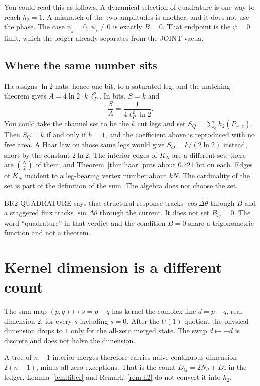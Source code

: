 You could read this as follows.
A dynamical selection of quadrature is one way to reach \(h_2=1\).
A mismatch of the two amplitudes is another, and it does not use the
phase. The case \(\psi_j=0\), \(\psi_i\neq 0\) is exactly \(B=0\).
That endpoint is the \(\psi=0\) limit, which the ledger already separates
from the JOINT vacua.

\subsection{Where the same number sits}

I1a assigns \(\ln 2\) nats, hence one bit, to a saturated leg, and the
matching theorem gives \(A=4\ln 2\cdot k\,\ell_P^2\).
In bits, \(S=k\) and
\[
\frac{S}{A}=\frac{1}{4\ell_P^2\ln 2}.
\]
You could take the channel set to be the \(k\) cut legs and set
\(S_Q=\sum_e h_2(P_{-,e})\).
Then \(S_Q=k\) if and only if \(\bar h=1\),
and the coefficient above is reproduced with no free area.
A Haar law on those same legs would give \(S_Q=k/(2\ln 2)\) instead,
short by the constant \(2\ln 2\).
The interior edges of \(K_N\) are a different set:
there are \(\binom{N}{2}\) of them, and Theorem~\ref{thm:haar}
puts about \(0.721\) bit on each.
Edges of \(K_N\) incident to a leg-bearing vertex number about \(kN\).
The cardinality of the set is part of the definition of the sum.
The algebra does not choose the set.

BR2-QUADRATURE says that structural response tracks \(\cos\Delta\theta\)
through \(B\) and a staggered flux tracks \(\sin\Delta\theta\) through the current.
It does not set \(B_{ij}=0\).
The word ``quadrature'' in that verdict and the condition \(B=0\)
share a trigonometric function and not a theorem.

\section{Kernel dimension is a different count}
\label{sec:kernel}

\begin{lemma}
\label{lem:fiber}
The sum map \((p,q)\mapsto s=p+q\) has kernel the complex line \(d=p-q\),
real dimension \(2\), for every \(s\) including \(s=0\).
After the \(U(1)\) quotient the physical dimension drops to \(1\) only for
the all-zero merged state.
The swap \(d\mapsto -d\) is discrete and does not halve the dimension.
\end{lemma}

A tree of \(n-1\) interior merges therefore carries naive continuous
dimension \(2(n-1)\), minus all-zero exceptions.
That is the count \(D_Q=2N_d+D_c\) in the ledger.
Lemma~\ref{lem:fiber} and Remark~\ref{rem:h2} do not convert it into \(h_2\).


